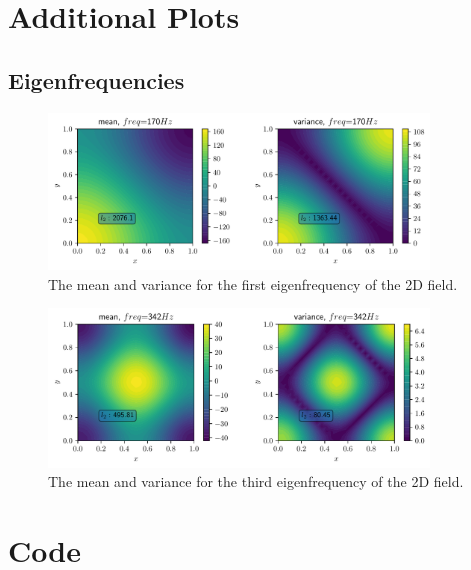 \documentclass[%
  a4paper,oneside,%
  11pt,%
  smallchapters,
  style=printdev,
  extramargin,
  green,%
  rgb, <cmyk>
  ]{tubsbook}
\begin{document}
\appendix
\renewcommand{\thesection}{\Alph{section}.\arabic{section}}
\setcounter{section}{0}
\begin{appendices}

\chapter{Additional Plots}

\section*{Eigenfrequencies}
\begin{figure}[!ht]
\begin{center}
\includegraphics[width=0.9\textwidth]{pics/Freq170}
\caption{The mean and variance for the first eigenfrequency of the 2D field.}
\label{fig:Eigen170}
\end{center}
\end{figure}

\begin{figure}[!ht]
\begin{center}
\includegraphics[width=0.9\textwidth]{pics/Freq342}
\caption{The mean and variance for the third eigenfrequency of the 2D field.}
\label{fig:Eigen342}
\end{center}
\end{figure}



\chapter{Code}

\end{appendices}
\end{document}
